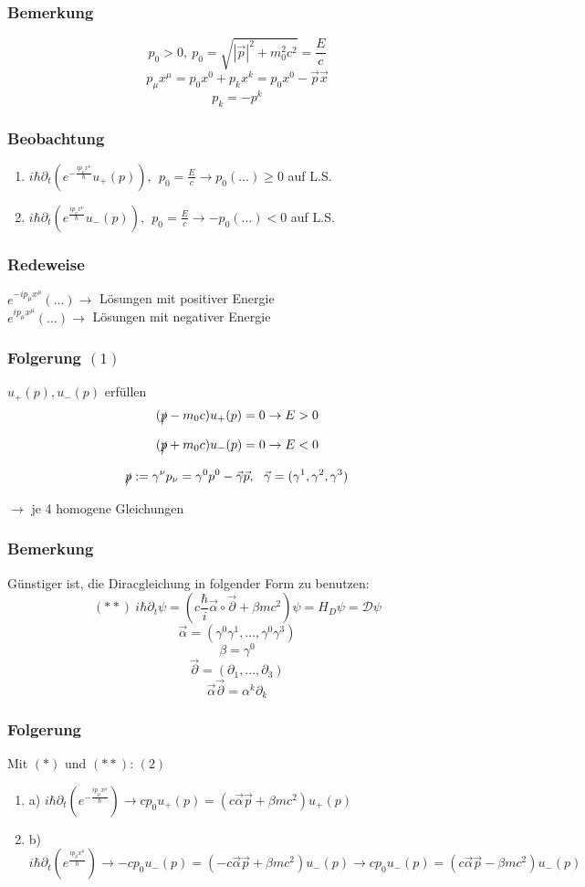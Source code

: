 \documentclass[twoside,a4paper]{scrartcl}
\newcommand{\D}{\mathcal{D}}
\renewcommand{\1}{\mathds{1}}
\newcommand{\ra}{\rightarrow}
\begin{document}
\subsubsection*{Bemerkung}
$$p_0>0, \ p_0=\sqrt{|\vec p|^2+m_0^2c^2}=\frac{E}{c}$$
$$p_\mu x^\mu=p_0x^0+p_kx^k=p_0x^0-\vec p \vec x$$
$$p_k=-p^k$$
\subsubsection*{Beobachtung}
\begin{enumerate}
\item $i\hbar \partial_t (e^{-\frac{ip_\nu x^\nu}{\hbar}}u_+(p)), \ \ p_0=\frac{E}{c} \ra p_0(...)\geq 0$ auf L.S.
\item $i\hbar \partial_t (e^{\frac{ip_\nu x^\nu}{\hbar}}u_-(p)), \ \ p_0=\frac{E}{c} \ra -p_0(...)<0$ auf L.S. 
\end{enumerate}
\subsubsection*{Redeweise}
$e^{-ip_\mu x^\mu}(...) \ra$ Lösungen mit positiver Energie\\
$e^{ip_\mu x^\mu}(...) \ra$ Lösungen mit negativer Energie\\

\subsubsection*{Folgerung $(1)$}
$u_+(p), u_-(p)$ erfüllen 
$$(\xout{p}-m_0c)u_+(p)=0 \ra E>0$$
$$(\xout{p}+m_0c)u_-(p)=0 \ra E<0$$
$$\xout{p}:=\gamma^\nu p_\nu=\gamma^0p^0-\vec \gamma \vec p, \ \ \vec \gamma=(\gamma^1,\gamma^2,\gamma^3)$$
$\ra$ je 4 homogene Gleichungen

\subsubsection*{Bemerkung}
Günstiger ist, die Diracgleichung in folgender Form zu benutzen:
$$(**) \ i\hbar \partial_t \psi=(c \frac{\hbar}{i} \vec \alpha \circ \vec \partial + \beta mc^2)\psi=H_D \psi=\D\psi$$
$$\vec \alpha=(\gamma^0\gamma^1,...,\gamma^0\gamma^3)$$
$$\beta=\gamma^0$$
$$\vec \partial =(\partial_1,...,\partial_3)$$
$$\vec \alpha \vec \partial=\alpha^k \partial_k$$
\subsubsection*{Folgerung}
Mit $(*)$ und $(**)$: $(2)$ 
\begin{enumerate}
\item a) $i\hbar \partial_t(e^{-\frac{ip_\mu x^\mu}{\hbar}}) \ra cp_0 u_+(p)=(c \vec \alpha \vec p +\beta mc^2)u_+(p)$
\item b) $i\hbar \partial_t(e^{\frac{ip_\mu x^\mu}{\hbar}}) \ra -cp_0 u_-(p)=(-c \vec \alpha \vec p +\beta mc^2)u_-(p) \ra cp_0 u_-(p)=(c \vec \alpha \vec p -\beta mc^2)u_-(p)$
\end{enumerate}
\end{document}
